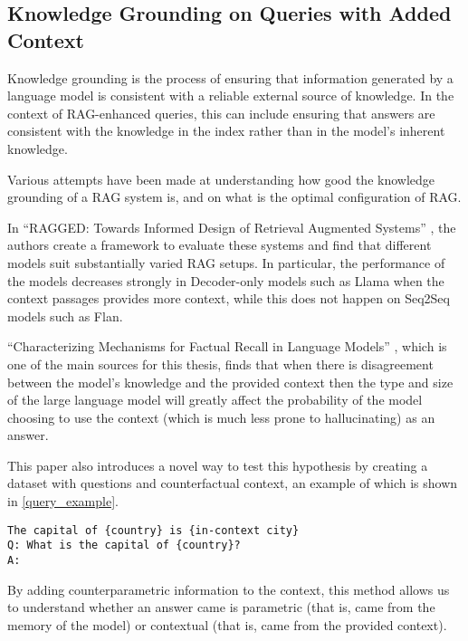 \subsection{Knowledge Grounding on Queries with Added Context}

Knowledge grounding is the process of ensuring that information generated by a language model is consistent with a reliable external source of knowledge.
In the context of RAG-enhanced queries, this can include ensuring that answers are consistent with the knowledge in the index rather than in the model's inherent knowledge.

Various attempts have been made at understanding how good the knowledge grounding of a RAG system is, and on what is the optimal configuration of RAG.

In ``RAGGED: Towards Informed Design of Retrieval Augmented Systems'' \citep{ragged}, the authors create a framework to evaluate these systems and find that different models suit substantially varied RAG setups.
In particular, the performance of the models decreases strongly in Decoder-only models such as Llama when the context passages provides more context, while this does not happen on Seq2Seq models such as Flan.

``Characterizing Mechanisms for Factual Recall in Language Models'' \citep{factual_recall}, which is one of the main sources for this thesis, finds that when there is disagreement between the model's knowledge and the provided context then the type and size of the large language model will greatly affect the probability of the model choosing to use the context (which is much less prone to hallucinating) as an answer.

This paper also introduces a novel way to test this hypothesis by creating a dataset with questions and counterfactual context, an example of which is shown in \cref{query_example}.

\begin{center}
	\begin{lstlisting}[caption={Example of queries used in \citep{factual_recall}. These queries form the basis and inspiration for the dataset creation done in this thesis}, label={query_example},basicstyle=\ttfamily\small, keywordstyle=\bfseries, keywords={country,in-context city},captionpos=b,frame=single,breaklines=true,linewidth=300pt]
The capital of {country} is {in-context city}
Q: What is the capital of {country}?
A:
	\end{lstlisting}
\end{center}

By adding counterparametric information to the context, this method allows us to understand whether an answer came is parametric (that is, came from the memory of the model) or contextual (that is, came from the provided context).
